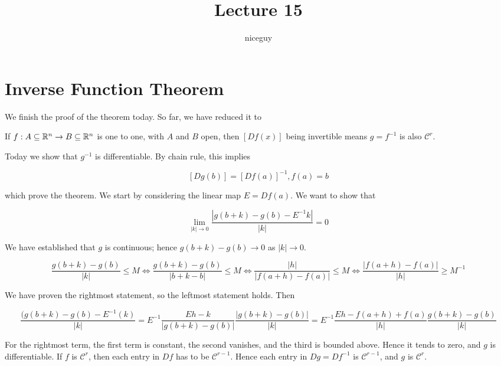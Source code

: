 \documentclass[12pt]{article}
\title{Lecture 15}
\author{niceguy}
\begin{document}
\maketitle

\section{Inverse Function Theorem}

We finish the proof of the theorem today. So far, we have reduced it to

\begin{thm}
    If $f: A \subseteq \mathbb{R}^n \rightarrow B \subseteq \mathbb{R}^n$ is one to one, with $A$ and $B$ open, then $[Df(x)]$ being invertible means $g=f^{-1}$ is also $\mathcal C^r$.
\end{thm}

Today we show that $g^{-1}$ is differentiable. By chain rule, this implies

$$[Dg(b)] = [Df(a)]^{-1}, f(a) = b$$

which prove the theorem. We start by considering the linear map $E = Df(a)$. We want to show that

$$\lim_{|k|\rightarrow0} \frac{|g(b+k) - g(b) - E^{-1}k|}{|k|} = 0$$

We have established that $g$ is continuous; hence $g(b+k) - g(b) \rightarrow 0$ as $|k| \rightarrow 0$.

$$\frac{g(b+k) - g(b)}{|k|} \leq M \Leftrightarrow \frac{g(b+k) - g(b)}{|b+k-b|} \leq M \Leftrightarrow \frac{|h|}{|f(a+h) - f(a)|} \leq M \Leftrightarrow \frac{|f(a+h)-f(a)|}{|h|} \geq M^{-1}$$

We have proven the rightmost statement, so the leftmost statement holds. Then

$$\frac{(g(b+k) - g(b) - E^{-1}(k)}{|k|} = E^{-1} \frac{Eh - k}{|g(b+k) - g(b)|} \frac{|g(b+k) - g(b)|}{|k|} = E^{-1} \frac{Eh - f(a+h) + f(a)}{|h|} \frac{g(b+k) - g(b)}{|k|}$$

For the rightmost term, the first term is constant, the second vanishes, and the third is bounded above. Hence it tends to zero, and $g$ is differentiable. If $f$ is $\mathcal C^r$, then each entry in $Df$ has to be $\mathcal C^{r-1}$. Hence each entry in $Dg = Df^{-1}$ is $\mathcal C^{r-1}$, and $g$ is $\mathcal C^r$.
\end{document}
